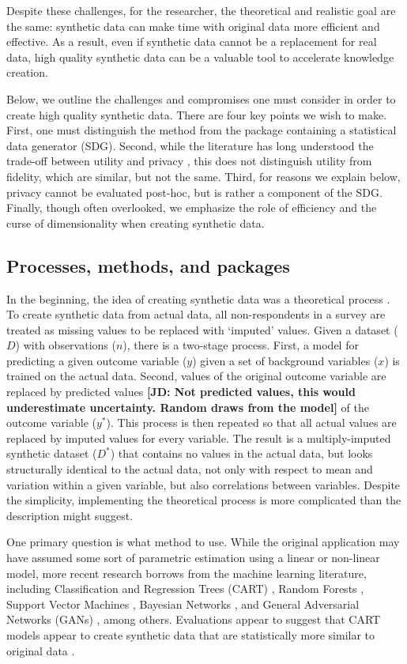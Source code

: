\documentclass[runningheads]{llncs}
\newcommand{\jd}[1]{\scriptsize {\bf \color{red}[JD: #1]}\normalsize}
\begin{document}
Despite these challenges, for the researcher, the theoretical and realistic goal are the same: synthetic data can make time with original data more efficient and effective.  As a result, even if synthetic data cannot be a replacement for real data, high quality synthetic data can be a valuable tool to accelerate knowledge creation.  

Below, we outline the challenges and compromises one must consider in order to create high quality synthetic data.  There are four key points we wish to make.  First, one must distinguish the method from the package containing a statistical data generator (SDG).  Second, while the literature has long understood the trade-off between utility and privacy \cite{duncan2004database}, this does not distinguish utility from fidelity, which are similar, but not the same.  Third, for reasons we explain below, privacy cannot be evaluated post-hoc, but is rather a component of the SDG.  Finally, though often overlooked, we emphasize the role of efficiency and the curse of dimensionality when creating synthetic data.  

\subsection{Processes, methods, and packages}

In the beginning, the idea of creating synthetic data was a theoretical process \cite{rubin1993statistical}.  To create synthetic data from actual data, all non-respondents in a survey are treated as missing values to be replaced with `imputed' values.  Given a dataset ($D$) with observations ($n$), there is a two-stage process.  First, a model for predicting a given outcome variable ($y$) given a set of background variables ($x$) is trained on the actual data.  Second, values of the original outcome variable are replaced by predicted values \jd{Not predicted values, this would underestimate uncertainty. Random draws from the model} of the outcome variable ($y^*$).  This process is then repeated so that all actual values are replaced by imputed values for every variable.  The result is a multiply-imputed synthetic dataset ($D^*$) that contains no values in the actual data, but looks structurally identical to the actual data, not only with respect to mean and variation within a given variable, but also correlations between variables.  Despite the simplicity, implementing the theoretical process is more complicated than the description might suggest.  

One primary question is what method to use.  While the original application may have assumed some sort of parametric estimation using a linear or non-linear model, more recent research borrows from the machine learning literature, including Classification and Regression Trees (CART) \cite{reiter2005using}, Random Forests \cite{caiola2010random}, Support Vector Machines \cite{drechsler2010using}, Bayesian Networks \cite{zhang2017privbayes}, and General Adversarial Networks (GANs) \cite{goodfellow2014generative}, among others.  Evaluations appear to suggest that CART models appear to create synthetic data that are statistically more similar to original data  \cite{little2022comparing,dankar2021fake,drechsler2011empirical}.  
\end{document}
